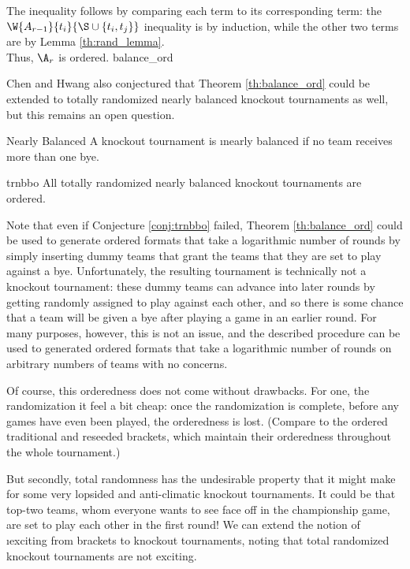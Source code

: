{{        The inequality follows by comparing each term to its corresponding term: the $\W{A_{r-1}}{t_i}{\S \cup \{t_i, t_j\}}$ inequality is by induction, while the other two terms are by Lemma \ref{th:rand_lemma}.\\

        Thus, $\A_r$ is ordered.
    }{balance_ord}

    Chen and Hwang also conjectured that Theorem \ref{th:balance_ord} could be extended to totally randomized nearly balanced knockout tournaments as well, but this remains an open question.

    \begin{definition}{Nearly Balanced}{}
        A knockout tournament is \i{nearly balanced} if no team receives more than one bye.
    \end{definition}

    \begin{conj}{}{trnbbo}
        All totally randomized nearly balanced knockout tournaments are ordered.
    \end{conj}

    Note that even if Conjecture \ref{conj:trnbbo} failed, Theorem \ref{th:balance_ord} could be used to generate ordered formats that take a logarithmic number of rounds by simply inserting dummy teams that grant the teams that they are set to play against a bye. Unfortunately, the resulting tournament is technically not a knockout tournament: these dummy teams can advance into later rounds by getting randomly assigned to play against each other, and so there is some chance that a team will be given a bye after playing a game in an earlier round. For many purposes, however, this is not an issue, and the described procedure can be used to generated ordered formats that take a logarithmic number of rounds on arbitrary numbers of teams with no concerns.

    Of course, this orderedness does not come without drawbacks. For one, the randomization it feel a bit cheap: once the randomization is complete, before any games have even been played, the orderedness is lost. (Compare to the ordered traditional and reseeded brackets, which maintain their orderedness throughout the whole tournament.)
    
    But secondly, total randomness has the undesirable property that it might make for some very lopsided and anti-climatic knockout tournaments. It could be that top-two teams, whom everyone wants to see face off in the championship game, are set to play each other in the first round! We can extend the notion of \i{exciting} from brackets to knockout tournaments, noting that total randomized knockout tournaments are not exciting.

}
